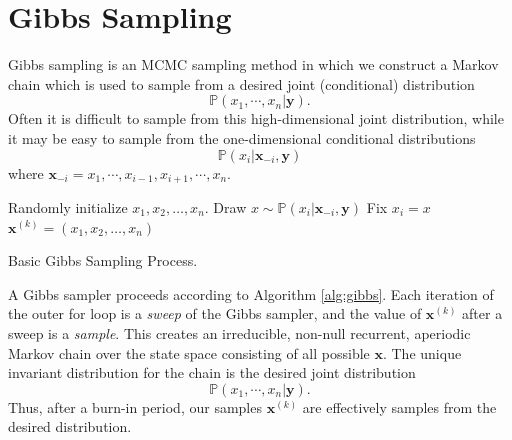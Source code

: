 
\section*{Gibbs Sampling}
Gibbs sampling is an MCMC sampling method in which we construct a Markov chain which is used to sample from a desired joint (conditional) distribution
\begin{equation*}
\mathbb{P}(x_{1},\cdots,x_{n} | \mathbf{y}).
\end{equation*}
Often it is difficult to sample from this high-dimensional joint distribution, while it may be easy to sample from the one-dimensional
conditional distributions
\begin{equation*}
\mathbb{P}(x_{i} | \mathbf{x}_{-i}, \mathbf{y})
\end{equation*}
where $\mathbf{x}_{-i} = x_{1},\cdots,x_{i-1},x_{i+1},\cdots,x_{n}.$

\begin{algorithm}
\begin{algorithmic}[1]
    \State \textrm{Randomly initialize } $x_1,x_2,\ldots,x_n$.
            \State \textrm{Draw } $x \sim \mathbb{P}(x_{i} | \mathbf{x}_{-i}, \mathbf{y})$
            \State \textrm{Fix } $x_i = x$
        \EndFor
        \State $\mathbf{x}^{(k)}= (x_1,x_2,\ldots,x_n)$
    \EndFor
\EndProcedure
\end{algorithmic}
\caption{Basic Gibbs Sampling Process.}
\label{alg:gibbs}
\end{algorithm}
A Gibbs sampler proceeds according to Algorithm \ref{alg:gibbs}.
Each iteration of the outer for loop is a \emph{sweep} of the Gibbs sampler, and the value of $\mathbf{x}^{(k)}$ after a sweep is a \emph{sample}.
This creates an irreducible, non-null recurrent, aperiodic Markov chain over the state space consisting of all possible $\mathbf{x}$.
The unique invariant distribution for the chain is the desired joint distribution
\begin{equation*}
\mathbb{P}(x_{1},\cdots,x_{n} | \mathbf{y}).
\end{equation*}
Thus, after a burn-in period, our samples $\mathbf{x}^{(k)}$ are effectively samples from the desired distribution.

